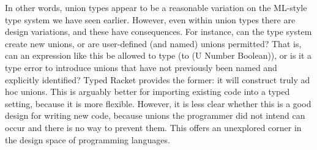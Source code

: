 In other words, union types appear to be a reasonable variation on the ML-style
type system we have seen earlier. However, even within union types there are
design variations, and these have consequences. For instance, can the type
system create new unions, or are user-defined (and named) unions permitted? That
is, can an expression like this
be allowed to type (to (U Number Boolean)), or is it a type error to introduce
unions that have not previously been named and explicitly identified? Typed
Racket provides the former: it will construct truly ad hoc unions. This is
arguably better for importing existing code into a typed setting, because it is
more flexible. However, it is less clear whether this is a good design for
writing new code, because unions the programmer did not intend can occur and
there is no way to prevent them. This offers an unexplored corner in the design
space of programming languages.

\secup